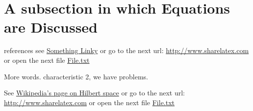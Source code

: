 \section{A subsection in which Equations are Discussed}

references see \href{http://www.sharelatex.com}{Something Linky} or go
to the next url: \url{http://www.sharelatex.com} or open the next file
\href{run:./file.txt}{File.txt}
 
More words.  
characteristic 2, we have problems.

See \href{https://en.wikipedia.org/wiki/Hilbert\_space}{Wikipedia's
  page on Hilbert space} or go to the next url:
\url{http://www.sharelatex.com} or open the next file
\href{run:./file.txt}{File.txt}
